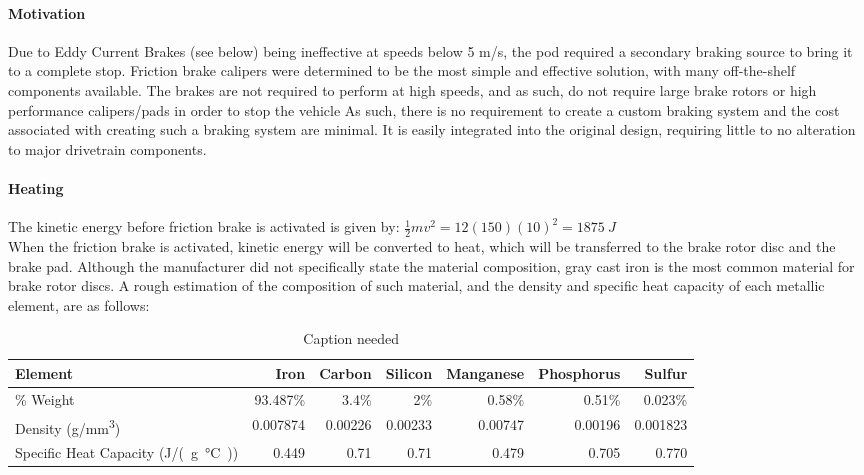 \documentclass[main.tex]{subfiles}
\begin{document}
    \paragraph{Motivation}
    Due to Eddy Current Brakes (see below) being ineffective at speeds below 5 m/s, the pod required a secondary braking source to bring it to a complete stop. Friction brake calipers were determined to be the most simple and effective solution, with many off-the-shelf components available. The brakes are not required to perform at high speeds, and as such, do not require large brake rotors or high performance calipers/pads in order to stop the vehicle  As such, there is no requirement to create a custom braking system and the cost associated with creating such a braking system are minimal. It is easily integrated into the original design, requiring little to no alteration to major drivetrain components.\\

    \paragraph{Heating}
    The kinetic energy before friction brake is activated is given by: $\frac{1}{2}mv^2=12(150)(10)^2=\SI{1875}{J}$\\
    When the friction brake is activated, kinetic energy will be converted to heat, which will be transferred to the brake rotor disc and the brake pad.
    Although the manufacturer did not specifically state the material composition, gray cast iron is the most common material for brake rotor discs. A rough estimation of the composition of such material, and the density and specific heat capacity of each metallic element, are as follows:\\

    \begin{table}[H]
        \centering
        \begin{tabular}{@{}lrrrrrr@{}} \toprule
            Element & Iron & Carbon & Silicon & Manganese & Phosphorus & Sulfur\\ \midrule
            \% Weight & 93.487\% & 3.4\% & 2\% & 0.58\% & 0.51\% & 0.023\%\\
            Density (\si{g/mm^3}) & 0.007874 & 0.00226 & 0.00233 & 0.00747 & 0.00196 & 0.001823\\
            Specific Heat Capacity (\si{J/(g\celsius)}) & 0.449 & 0.71 & 0.71 & 0.479 & 0.705 & 0.770\\ \bottomrule
        \end{tabular}
        \caption{Caption needed}
    \end{table}
\end{document}
